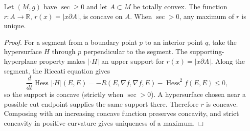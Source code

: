\begin{lemma}
  \label{lem:pet-ch12-distance-to-boundary-concave}
  Let $(M,g)$ have $\sec\ge0$ and let $A\subset M$ be totally convex. The
  function $r:A\to\mathbb{R}$, $r(x)=|x\partial A|$, is concave on $A$. When
  $\sec>0$, any maximum of $r$ is unique.
\end{lemma}
\begin{proof}
  \sketch
  For a segment from a boundary point \(p\) to an interior point \(q\), take
  the hypersurface \(H\) through \(p\) perpendicular to the segment. The
  supporting-hyperplane property makes \( |\cdot H|\) an upper support for
  \(r(x)=|x\partial A|\). Along the segment, the Riccati equation gives
  \[ \frac{d}{dt}\operatorname{Hess}|\cdot H|(E,E)
     =-R(E,\nabla f,\nabla f,E)-\operatorname{Hess}^2f(E,E)\le0, \]
  so the support is concave (strictly when \(\sec>0\)). A hypersurface chosen
  near a possible cut endpoint supplies the same support there. Therefore \(r\)
  is concave. Composing with an increasing concave function preserves
  concavity, and strict concavity in positive curvature gives uniqueness of a
  maximum.
\end{proof}

